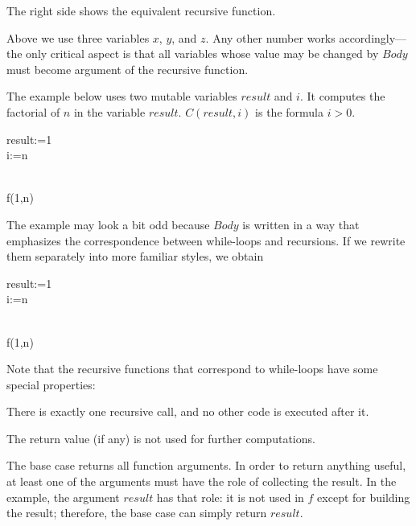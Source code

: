 The right side shows the equivalent recursive function.

Above we use three variables $x$, $y$, and $z$.
Any other number works accordingly---the only critical aspect is that all variables whose value may be changed by $Body$ must become argument of the recursive function.

The example below uses two mutable variables $result$ and $i$.
It computes the factorial of $n$ in the variable $result$.
$C(result,i)$ is the formula $i>0$.

\newpage
\begin{multicols}{2}
\begin{acode}
result:=1\\
i:=n\\
\end{acode}
\columnbreak
\begin{acode}
\\
f(1,n)
\end{acode}
\end{multicols}

The example may look a bit odd because $Body$ is written in a way that emphasizes the correspondence between while-loops and recursions.
If we rewrite them separately into more familiar styles, we obtain

\begin{multicols}{2}
\begin{acode}
result:=1\\
i:=n\\
\end{acode}
\columnbreak
\begin{acode}
\\
f(1,n)
\end{acode}
\end{multicols}

Note that the recursive functions that correspond to while-loops have some special properties:
\begin{compactitem}
 \item There is exactly one recursive call, and no other code is executed after it.
 \item The return value (if any) is not used for further computations.
 \item The base case returns all function arguments.
  In order to return anything useful, at least one of the arguments must have the role of collecting the result.
  In the example, the argument $result$ has that role: it is not used in $f$ except for building the result; therefore, the base case can simply return $result$.
\end{compactitem}

